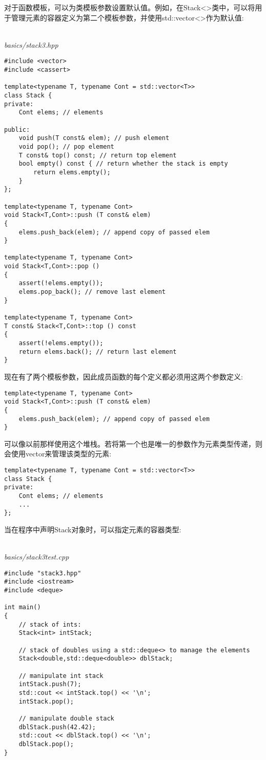对于函数模板，可以为类模板参数设置默认值。例如，在Stack<>类中，可以将用于管理元素的容器定义为第二个模板参数，并使用std::vector<>作为默认值:

\hspace*{\fill} \\ %
\noindent
\textit{basics/stack3.hpp}
\begin{lstlisting}[style=styleCXX]
#include <vector>
#include <cassert>

template<typename T, typename Cont = std::vector<T>>
class Stack {
private:
	Cont elems; // elements
	
public:
	void push(T const& elem); // push element
	void pop(); // pop element
	T const& top() const; // return top element
	bool empty() const { // return whether the stack is empty
		return elems.empty();
	}
};

template<typename T, typename Cont>
void Stack<T,Cont>::push (T const& elem)
{
	elems.push_back(elem); // append copy of passed elem
}

template<typename T, typename Cont>
void Stack<T,Cont>::pop ()
{
	assert(!elems.empty());
	elems.pop_back(); // remove last element
}

template<typename T, typename Cont>
T const& Stack<T,Cont>::top () const
{
	assert(!elems.empty());
	return elems.back(); // return last element
}
\end{lstlisting}

现在有了两个模板参数，因此成员函数的每个定义都必须用这两个参数定义:

\begin{lstlisting}[style=styleCXX]
template<typename T, typename Cont>
void Stack<T,Cont>::push (T const& elem)
{
	elems.push_back(elem); // append copy of passed elem
}
\end{lstlisting}

可以像以前那样使用这个堆栈。若将第一个也是唯一的参数作为元素类型传递，则会使用vector来管理该类型的元素:

\begin{lstlisting}[style=styleCXX]
template<typename T, typename Cont = std::vector<T>>
class Stack {
private:
	Cont elems; // elements
	...
};
\end{lstlisting}

当在程序中声明Stack对象时，可以指定元素的容器类型:

\hspace*{\fill} \\ %
\noindent
\textit{basics/stack3test.cpp}
\begin{lstlisting}[style=styleCXX]
#include "stack3.hpp"
#include <iostream>
#include <deque>

int main()
{
	// stack of ints:
	Stack<int> intStack;

	// stack of doubles using a std::deque<> to manage the elements
	Stack<double,std::deque<double>> dblStack;

	// manipulate int stack
	intStack.push(7);
	std::cout << intStack.top() << '\n';
	intStack.pop();

	// manipulate double stack
	dblStack.push(42.42);
	std::cout << dblStack.top() << '\n';
	dblStack.pop();
}
\end{lstlisting}


